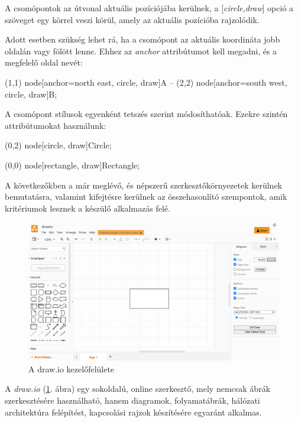 A csomópontok az útvonal aktuális pozíciójába kerülnek, a [\textit{circle,draw}] opció a szöveget egy körrel veszi körül, amely az aktuális pozícióba rajzolódik.

Adott esetben szükség lehet rá, ha a csomópont az aktuális koordináta jobb oldalán vagy fölött lenne. Ehhez az \textit{anchor} attribútumot kell megadni, és a megfelelő oldal nevét:

\begin{tikzcode}
\draw 
(1,1) node[anchor=north east, circle, draw]{A} 
	-- 
(2,2) node[anchor=south west, circle, draw]{B}; 
\end{tikzcode}

A csomópont stílusok egyenként tetszés szerint módosíthatóak. Ezekre szintén attribútumokat használunk:

\begin{tikzcode}
\draw (0,2) node[circle, draw]{Circle};



\draw (0,0) node[rectangle, draw]{Rectangle}; 
\end{tikzcode}



A következőkben a már meglévő, és népszerű szerkesztőkörnyezetek kerülnek bemutatásra, valamint kifejtésre kerülnek az összehasonlító szempontok, amik kritériumok lesznek a készülő alkalmazás felé.


\begin{figure}[!h]
	\includegraphics[width=\textwidth]{images/drawio.png}
	\caption{A draw.io kezelőfelülete \cite{drawio}}
	\label{fig:drawio}
\end{figure}

A \textit{draw.io} (\ref{fig:drawio}. ábra) egy sokoldalú, online szerkesztő, mely nemcsak ábrák szerkesztésére használható, hanem diagramok, folyamatábrák, hálózati architektúra felépítést, kapcsolási rajzok készítésére egyaránt alkalmas.

